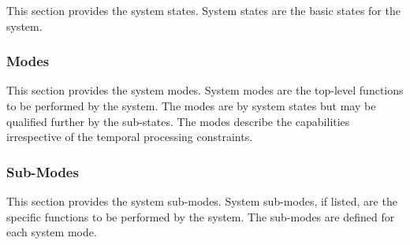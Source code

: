 This section provides the system states.
System states are the basic states for the system.



%

%


\subsubsection{Modes}
\label{loc:light_modes}

This section provides the system modes.
System modes are the top-level functions to be performed by the system.
The modes are by system states but may be qualified further by the sub-states.
The modes describe the capabilities irrespective of the temporal processing constraints.




\subsubsection{Sub-Modes}
\label{loc:light_submodes}

This section provides the system sub-modes.
System sub-modes, if listed, are the specific functions to be performed by the system.
The sub-modes are defined for each system mode.


